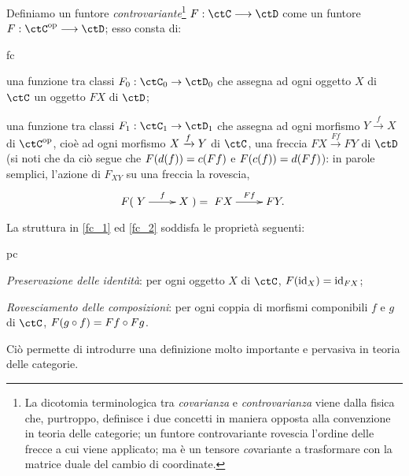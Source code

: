 \begin{definition}\label{def_funtore_contro}
	Definiamo un funtore \emph{controvariante}\footnote{La dicotomia terminologica tra \emph{covarianza} e \emph{controvarianza} viene dalla fisica che, purtroppo, definisce i due concetti in maniera opposta alla convenzione in teoria delle categorie; un funtore controvariante rovescia l'ordine delle frecce a cui viene applicato; ma è un tensore \emph{co}variante a trasformare con la matrice duale del cambio di coordinate.} \(F : \ctC \fun\ctD\) come un funtore \(F : \ctC^\op\fun\ctD\); esso consta di:
	\begin{enumtag}{fc}
		\item \label{fc_1} una funzione tra classi \(F_0 : \ctC_0\to\ctD_0\) che assegna ad ogni oggetto \(X\) di \(\ctC\) un oggetto \(FX\) di \(\ctD\);
		\item \label{fc_2} una funzione tra classi \(F_1 : \ctC_1\to\ctD_1\) che assegna ad ogni morfismo \(Y \xrightarrow{f} X\) di \(\ctC^\op\), cioè ad ogni morfismo \(X\xrightarrow{f} Y\) di \(\ctC\), una freccia \(FX \xrightarrow{Ff} FY\) di \(\ctD\) (si noti che da ciò segue che \(F(d(f))=c(Ff)\) e \(F(c(f))=d(Ff)\)): in parole semplici, l'azione di \(F_{XY}\) su una freccia la rovescia,
		\[F(\xymatrix{Y \ar[r]^f & X}) = \xymatrix{FX \ar[r]^{Ff} & FY.}\]
	\end{enumtag}
	La struttura in \ref{fc_1} ed \ref{fc_2} soddisfa le proprietà seguenti:
	\begin{enumtag}{pc}
		\item \label{pc_1} \emph{Preservazione delle identità}: per ogni oggetto \(X\) di \(\ctC\), \(F(\mathrm{id}_X)=\mathrm{id}_{FX}\);
		\item \label{pc_2} \emph{Rovesciamento delle composizioni}: per ogni coppia di morfismi componibili \(f\) e \(g\) di \(\ctC\), \(F(g\circ f)=Ff\circ Fg\).
	\end{enumtag}
\end{definition}
Ciò permette di introdurre una definizione molto importante e pervasiva in teoria delle categorie.
